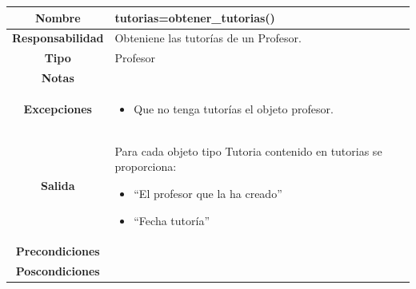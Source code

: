    
               \begin{table}[!ht]
\begin{tabular}{|c|m{10cm}|}
\hline\rowcolor{Gray}
{\bf Nombre } & {tutorias=obtener\_tutorias()}\\
\hline
{\bf Responsabilidad } & {Obteniene las tutorías de un Profesor.}\\
\hline
\rowcolor{Gray}
{\bf Tipo } & {Profesor} \\
\hline
{\bf Notas } & { } \\
\hline
\rowcolor{Gray}
{\bf Excepciones }& {
\begin{itemize}
\item Que no tenga tutorías el objeto profesor.
\end{itemize}
} \\
\hline
{\bf Salida }& 

	  { 	
	  Para cada objeto tipo Tutoria contenido en tutorias se proporciona:
	  \begin{itemize}
	  \item \enquote{El profesor que la ha creado}
	  \item \enquote{Fecha tutoría}
	  \end{itemize}
	  } 


 \\
\hline
\rowcolor{Gray}
{\bf Precondiciones }& {}\\
\hline
{\bf Poscondiciones }& {
}  \\
\hline
\end{tabular}

\end{table}

